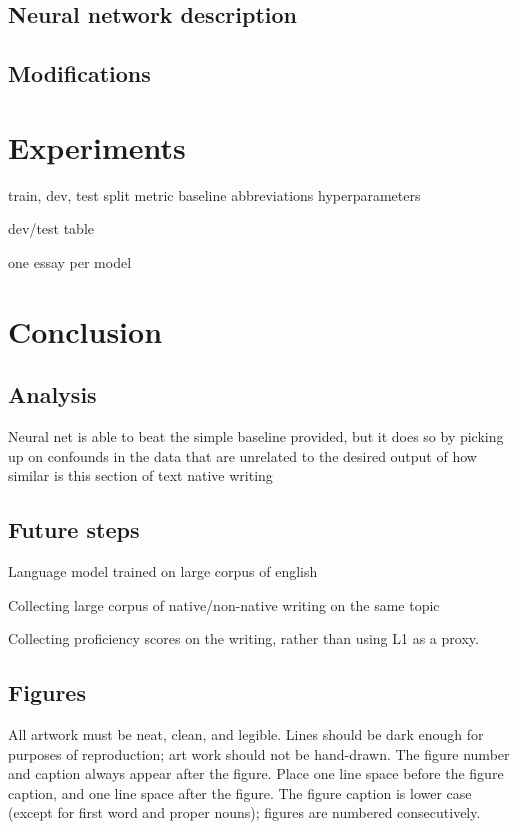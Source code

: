 \documentclass{article} %
\begin{document}
\subsection{Neural network description}

\subsection{Modifications}


\section{Experiments}

train, dev, test split
metric
baseline
abbreviations
hyperparameters

dev/test table

one essay per model

\section{Conclusion}

\subsection{Analysis}
Neural net is able to beat the simple baseline provided, but it does so by
picking up on confounds in the data that are unrelated to the desired output
of how similar is this section of text native writing


\subsection{Future steps}
Language model trained on large corpus of english

Collecting large corpus of native/non-native writing on the same topic

Collecting proficiency scores on the writing, rather than using L1 as
a proxy.

\subsection{Figures}

All artwork must be neat, clean, and legible. Lines should be dark
enough for purposes of reproduction; art work should not be
hand-drawn. The figure number and caption always appear after the
figure. Place one line space before the figure caption, and one line
space after the figure. The figure caption is lower case (except for
first word and proper nouns); figures are numbered consecutively.
\end{document}
